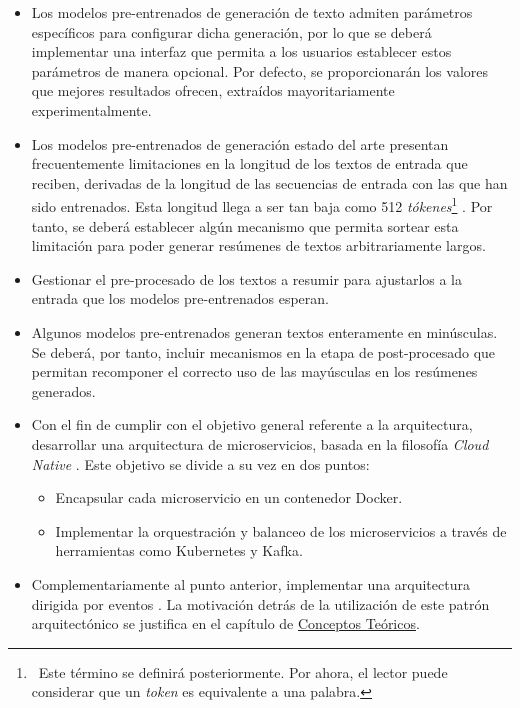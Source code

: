\vspace{-0.2cm}
\begin{itemize} [\textbullet]
	\item Los modelos pre-entrenados de generación de texto admiten parámetros específicos para configurar dicha generación, por lo que se deberá implementar una interfaz que permita a los usuarios establecer estos parámetros de manera opcional. Por defecto, se proporcionarán los valores que mejores resultados ofrecen, extraídos mayoritariamente experimentalmente.
	
	\item Los modelos pre-entrenados de generación estado del arte presentan frecuentemente limitaciones en la longitud de los textos de entrada que reciben, derivadas de la longitud de las secuencias de entrada con las que han sido entrenados. Esta longitud llega a ser tan baja como 512 \emph{tókenes}\footnote{\, Este término se definirá posteriormente. Por ahora, el lector puede considerar que un \emph{token} es equivalente a una palabra.} \cite{raffel19}. Por tanto, se deberá establecer algún mecanismo que permita sortear esta limitación para poder generar resúmenes de textos arbitrariamente largos.

	\item Gestionar el pre-procesado de los textos a resumir para ajustarlos a la entrada que los modelos pre-entrenados esperan.

	\item Algunos modelos pre-entrenados generan textos enteramente en minúsculas. Se deberá, por tanto, incluir mecanismos en la etapa de post-procesado que permitan recomponer el correcto uso de las mayúsculas en los resúmenes generados.

	\item Con el fin de cumplir con el objetivo general referente a la arquitectura, desarrollar una arquitectura de microservicios, basada en la filosofía \emph{Cloud Native} \cite{cloud20, arundel19}. Este objetivo se divide a su vez en dos puntos:
	\begin{itemize} [◦]
		\item Encapsular cada microservicio en un contenedor Docker.
		\item Implementar la orquestración y balanceo de los microservicios a través de herramientas como Kubernetes y Kafka.
	\end{itemize}

	\item Complementariamente al punto anterior, implementar una arquitectura dirigida por eventos \cite{bellemare20}. La motivación detrás de la utilización de este patrón arquitectónico se justifica en el capítulo de \hyperref[chapter:conceptos]{Conceptos Teóricos}.
	

\end{itemize}
